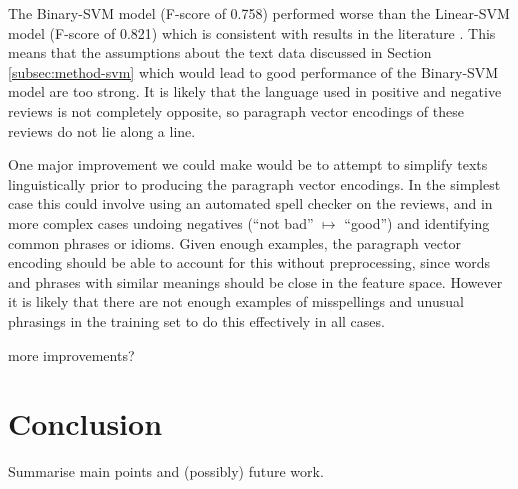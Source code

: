 \documentclass[11pt]{article}
\newcommand{\drafting}[1]{\textcolor{OliveGreen}{#1}}
\begin{document}
The Binary-SVM model (F-score of 0.758) performed worse than the Linear-SVM model (F-score of 0.821) which is consistent with results in the literature \cite{koppel_importance_2006}. This means that the assumptions about the text data discussed in Section \ref{subsec:method-svm} which would lead to good performance of the Binary-SVM model are too strong. It is likely that the language used in positive and negative reviews is not completely opposite, so paragraph vector encodings of these reviews do not lie along a line.

One major improvement we could make would be to attempt to simplify texts linguistically prior to producing the paragraph vector encodings. In the simplest case this could involve using an automated spell checker on the reviews, and in more complex cases undoing negatives (``not bad'' $\mapsto$ ``good'') and identifying common phrases or idioms. Given enough examples, the paragraph vector encoding should be able to account for this without preprocessing, since words and phrases with similar meanings should be close in the feature space. However it is likely that there are not enough examples of misspellings and unusual phrasings in the training set to do this effectively in all cases.

\drafting{more improvements?}


\section{Conclusion}
\drafting{Summarise main points and (possibly) future work.}


\nocite{mukherjee_what_2013}
\nocite{rayana_collective_2015}

\nocite{sklearn_pedregosa_scikit-learn_2011}
\nocite{gensim_rehurek_software_2010}


\end{document}
